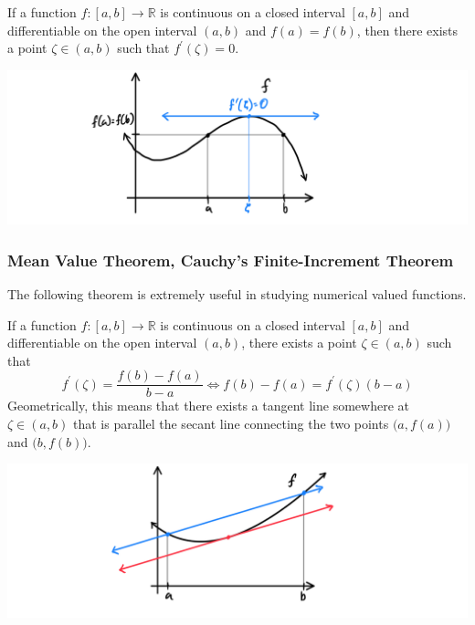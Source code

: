 \documentclass{article}
\begin{document}
    \begin{theorem}
    If a function $f: [a, b] \longrightarrow \mathbb{R}$ is continuous on a closed interval $[a,b]$ and differentiable on the open interval $(a, b)$ and $f(a) = f(b)$, then there exists a point $\zeta \in (a, b)$ such that $f^\prime (\zeta) = 0$. 
    \begin{center}
        \includegraphics[scale=0.25]{img/Analysis_Rolles_Theorem.PNG}
    \end{center}
    \end{theorem}

    \subsubsection{Mean Value Theorem, Cauchy's Finite-Increment Theorem}

    The following theorem is extremely useful in studying numerical valued functions. 

    \begin{theorem}
    If a function $f: [a,b] \longrightarrow \mathbb{R}$ is continuous on a closed interval $[a,b]$ and differentiable on the open interval $(a, b)$, there exists a point $\zeta \in (a, b)$ such that 
    \[f^\prime (\zeta) = \frac{f(b) - f(a)}{b - a} \iff f(b) - f(a) = f^\prime (\zeta) (b-a)\]
    Geometrically, this means that there exists a tangent line somewhere at $\zeta \in (a, b)$ that is parallel the secant line connecting the two points $\big(a, f(a)\big)$ and $\big( b, f(b)\big)$. 
    \begin{center}
        \includegraphics[scale=0.25]{img/Analysis_Mean_Value_Theorem_Diagram.PNG}
    \end{center}
    \end{theorem}
\end{document}
